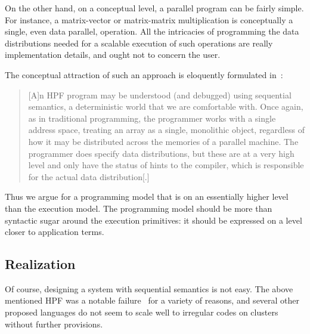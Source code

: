 On the other hand, on a conceptual level, a parallel program
can be fairly simple. For instance, a matrix-vector or
matrix-matrix multiplication is conceptually a single,
even data parallel, operation. All the intricacies of programming
the data distributions needed for a scalable execution of
such operations are really implementation details, and ought not to
concern the user.

The conceptual attraction of such an
approach is eloquently formulated in~\cite{Nikhil93anoverview}:
\begin{quotation}
  [A]n HPF program may be understood (and debugged) using sequential
  semantics, a deterministic world that we are comfortable with. Once
  again, as in traditional programming, the programmer works with a
  single address space, treating an array as a single, monolithic
  object, regardless of how it may be distributed across the memories
  of a parallel machine. The programmer does specify data
  distributions, but these are at a very high level and only have the
  status of hints to the compiler, which is responsible for the actual
  data distribution[.]
\end{quotation}

Thus we argue for a programming model that is on an essentially higher
level than the execution model. The programming model should be more
than syntactic sugar around the execution primitives: it should be
expressed on a level closer to application terms.

\subsection{Realization}

Of course, designing a system with sequential semantics is not easy.
The above mentioned HPF was a notable failure~\cite{Kennedy:riseandfall}
for a variety of reasons, and several other proposed languages
do not seem to scale well to irregular codes on clusters
without further provisions.

